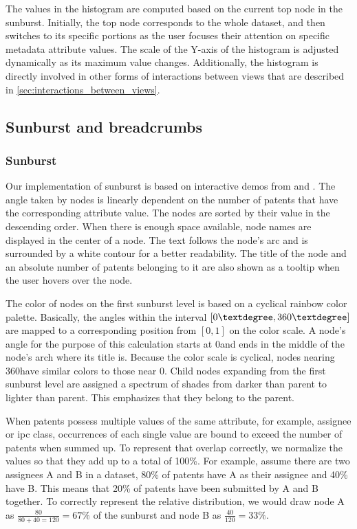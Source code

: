The values in the histogram are computed based on the current top node in the sunburst.
Initially, the top node corresponds to the whole dataset, and then switches to its specific portions as the user focuses their attention on specific metadata attribute values.
The scale of the Y-axis of the histogram is adjusted dynamically as its maximum value changes.
Additionally, the histogram is directly involved in other forms of interactions between views that are described in \autoref{sec:interactions_between_views}.

\subsection{Sunburst and breadcrumbs}
\label{subsec:sunburst_and_breadcrumbs}

\subsubsection{Sunburst}
\label{subsubsec:sunburst}
Our implementation of sunburst is based on interactive demos from \cite{Asturiano} and \cite{Trott}.
The angle taken by nodes is linearly dependent on the number of patents that have the corresponding attribute value.
The nodes are sorted by their value in the descending order.
When there is enough space available, node names are displayed in the center of a node.
The text follows the node's arc and is surrounded by a white contour for a better readability.
The title of the node and an absolute number of patents belonging to it are also shown as a tooltip when the user hovers over the node.

The color of nodes on the first sunburst level is based on a cyclical rainbow color palette.
Basically, the angles within the interval $[0\textdegree, 360\textdegree]$ are mapped to a corresponding position from $[0, 1]$ on the color scale.
A node's angle for the purpose of this calculation starts at 0\textdegree and ends in the middle of the node's arch where its title is.
Because the color scale is cyclical, nodes nearing 360\textdegree have similar colors to those near 0\textdegree.
Child nodes expanding from the first sunburst level are assigned a spectrum of shades from darker than parent to lighter than parent.
This emphasizes that they belong to the parent.

When patents possess multiple values of the same attribute, for example, assignee or \gls{ipc} class, occurrences of each single value are bound to exceed the number of patents when summed up.
To represent that overlap correctly, we normalize the values so that they add up to a total of 100\%.
For example, assume there are two assignees A and B in a dataset, 80\% of patents have A as their assignee and 40\% have B.
This means that 20\% of patents have been submitted by A and B together.
To correctly represent the relative distribution, we would draw node A as $\frac{80}{80+40=120} = 67\%$ of the sunburst and node B as $\frac{40}{120} = 33\%$.

